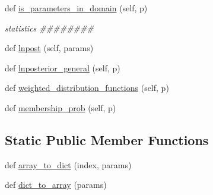 \begin{DoxyCompactItemize}
\item 
def \hyperlink{classmodki17_1_1modKI17_a649064bb198ade8a8c6c59faeab6c9c4}{is\+\_\+parameters\+\_\+in\+\_\+domain} (self, p)
\begin{DoxyCompactList}\small\item\em statistics \#\#\#\#\#\#\#\# \end{DoxyCompactList}\item 
def \hyperlink{classmodki17_1_1modKI17_aa8e6d0ca906f1ab77cfc64f7ec15f327}{lnpost} (self, params)
\item 
def \hyperlink{classmodki17_1_1modKI17_ae26b505fa65c5f8b3c589a20f849879a}{lnposterior\+\_\+general} (self, p)
\item 
def \hyperlink{classmodki17_1_1modKI17_abab55a25d43afbd5737246fd8da155f7}{weighted\+\_\+distribution\+\_\+functions} (self, p)
\item 
def \hyperlink{classmodki17_1_1modKI17_acfc9325282029b80be3c61c03d64c5cd}{membership\+\_\+prob} (self, p)
\end{DoxyCompactItemize}
\subsection*{Static Public Member Functions}
\begin{DoxyCompactItemize}
\item 
def \hyperlink{classmodki17_1_1modKI17_a3dbb8b3805bcb0e1253c367f016a6073}{array\+\_\+to\+\_\+dict} (index, params)
\item 
def \hyperlink{classmodki17_1_1modKI17_a8f55186927e70d2132cc05d2cde7f25f}{dict\+\_\+to\+\_\+array} (params)
\end{DoxyCompactItemize}
